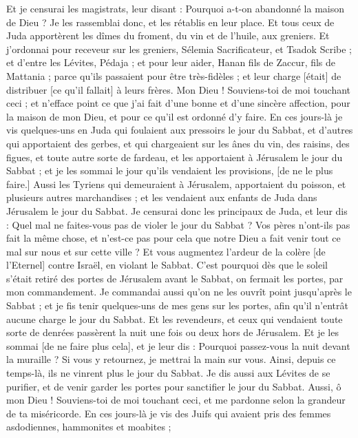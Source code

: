 \begin{multicols}{2}
{Et je censurai les magistrats, leur disant : Pourquoi a-t-on abandonné la maison de Dieu ? Je les rassemblai donc, et les rétablis en leur place.
Et tous ceux de Juda apportèrent les dîmes du froment, du vin et de l'huile, aux greniers.
Et j'ordonnai pour receveur sur les greniers, Sélemia Sacrificateur, et Tsadok Scribe ; et d'entre les Lévites, Pédaja ; et pour leur aider, Hanan fils de Zaccur, fils de Mattania ; parce qu'ils passaient pour être très-fidèles ; et leur charge [était] de distribuer [ce qu'il fallait] à leurs frères.
Mon Dieu ! Souviens-toi de moi touchant ceci ; et n'efface point ce que j'ai fait d'une bonne et d'une sincère affection, pour la maison de mon Dieu, et pour ce qu'il est ordonné d'y faire.
En ces jours-là je vis quelques-uns en Juda qui foulaient aux pressoirs le jour du Sabbat, et d'autres qui apportaient des gerbes, et qui chargeaient sur les ânes du vin, des raisins, des figues, et toute autre sorte de fardeau, et les apportaient à Jérusalem le jour du Sabbat ; et je les sommai le jour qu'ils vendaient les provisions, [de ne le plus faire.]
Aussi les Tyriens qui demeuraient à Jérusalem, apportaient du poisson, et plusieurs autres marchandises ; et les vendaient aux enfants de Juda dans Jérusalem le jour du Sabbat.
Je censurai donc les principaux de Juda, et leur dis : Quel mal ne faites-vous pas de violer le jour du Sabbat ?
Vos pères n'ont-ils pas fait la même chose, et n'est-ce pas pour cela que notre Dieu a fait venir tout ce mal sur nous et sur cette ville ? Et vous augmentez l'ardeur de la colère [de l'Eternel] contre Israël, en violant le Sabbat.
C'est pourquoi dès que le soleil s'était retiré des portes de Jérusalem avant le Sabbat, on fermait les portes, par mon commandement. Je commandai aussi qu'on ne les ouvrît point jusqu'après le Sabbat ; et je fis tenir quelques-uns de mes gens sur les portes, afin qu'il n'entrât aucune charge le jour du Sabbat.
Et les revendeurs, et ceux qui vendaient toute sorte de denrées passèrent la nuit une fois ou deux hors de Jérusalem.
Et je les sommai [de ne faire plus cela], et je leur dis : Pourquoi passez-vous la nuit devant la muraille ? Si vous y retournez, je mettrai la main sur vous. Ainsi, depuis ce temps-là, ils ne vinrent plus le jour du Sabbat.
Je dis aussi aux Lévites de se purifier, et de venir garder les portes pour sanctifier le jour du Sabbat. Aussi, ô mon Dieu ! Souviens-toi de moi touchant ceci, et me pardonne selon la grandeur de ta miséricorde.
En ces jours-là je vis des Juifs qui avaient pris des femmes asdodiennes, hammonites et moabites ;
}
\end{multicols}
